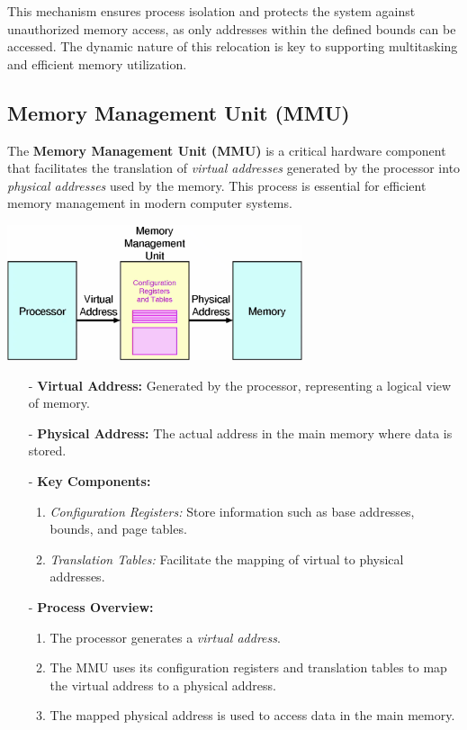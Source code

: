 This mechanism ensures process isolation and protects the system against unauthorized memory access, as only addresses within the defined bounds can be accessed. The dynamic nature of this relocation is key to supporting multitasking and efficient memory utilization.
\newpage
\subsection{Memory Management Unit (MMU)}
The \textbf{Memory Management Unit (MMU)} is a critical hardware component that facilitates the translation of \textit{virtual addresses} generated by the processor into \textit{physical addresses} used by the memory. This process is essential for efficient memory management in modern computer systems.

\begin{center}
    \includegraphics[width=0.65\textwidth]{chapters/chapter3c/images/MMU2.png}
\end{center}
\begin{itemize}
    \item[-] \textbf{Virtual Address:} Generated by the processor, representing a logical view of memory.
    \item[-] \textbf{Physical Address:} The actual address in the main memory where data is stored.
    \item[-] \textbf{Key Components:}
    \begin{enumerate}
        \item \textit{Configuration Registers:} Store information such as base addresses, bounds, and page tables.
        \item \textit{Translation Tables:} Facilitate the mapping of virtual to physical addresses.
    \end{enumerate}
    \item[-] \textbf{Process Overview:}
    \begin{enumerate}
        \item The processor generates a \textit{virtual address}.
        \item The MMU uses its configuration registers and translation tables to map the virtual address to a physical address.
        \item The mapped physical address is used to access data in the main memory.
    \end{enumerate}
\end{itemize}


